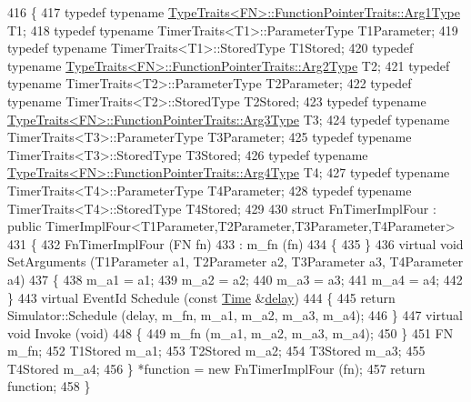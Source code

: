 \begin{DoxyCode}
416 \{
417   \textcolor{keyword}{typedef} \textcolor{keyword}{typename} \hyperlink{structTypeTraits}{TypeTraits<FN>::FunctionPointerTraits::Arg1Type}
       T1;
418   \textcolor{keyword}{typedef} \textcolor{keyword}{typename} TimerTraits<T1>::ParameterType T1Parameter;
419   \textcolor{keyword}{typedef} \textcolor{keyword}{typename} TimerTraits<T1>::StoredType T1Stored;
420   \textcolor{keyword}{typedef} \textcolor{keyword}{typename} \hyperlink{structTypeTraits}{TypeTraits<FN>::FunctionPointerTraits::Arg2Type}
       T2;
421   \textcolor{keyword}{typedef} \textcolor{keyword}{typename} TimerTraits<T2>::ParameterType T2Parameter;
422   \textcolor{keyword}{typedef} \textcolor{keyword}{typename} TimerTraits<T2>::StoredType T2Stored;
423   \textcolor{keyword}{typedef} \textcolor{keyword}{typename} \hyperlink{structTypeTraits}{TypeTraits<FN>::FunctionPointerTraits::Arg3Type}
       T3;
424   \textcolor{keyword}{typedef} \textcolor{keyword}{typename} TimerTraits<T3>::ParameterType T3Parameter;
425   \textcolor{keyword}{typedef} \textcolor{keyword}{typename} TimerTraits<T3>::StoredType T3Stored;
426   \textcolor{keyword}{typedef} \textcolor{keyword}{typename} \hyperlink{structTypeTraits}{TypeTraits<FN>::FunctionPointerTraits::Arg4Type}
       T4;
427   \textcolor{keyword}{typedef} \textcolor{keyword}{typename} TimerTraits<T4>::ParameterType T4Parameter;
428   \textcolor{keyword}{typedef} \textcolor{keyword}{typename} TimerTraits<T4>::StoredType T4Stored;
429 
430   \textcolor{keyword}{struct }FnTimerImplFour : \textcolor{keyword}{public} TimerImplFour<T1Parameter,T2Parameter,T3Parameter,T4Parameter>
431   \{
432     FnTimerImplFour (FN fn)
433       : m\_fn (fn)
434     \{
435     \}
436     \textcolor{keyword}{virtual} \textcolor{keywordtype}{void} SetArguments (T1Parameter a1, T2Parameter a2, T3Parameter a3, T4Parameter a4)
437     \{
438       m\_a1 = a1;
439       m\_a2 = a2;
440       m\_a3 = a3;
441       m\_a4 = a4;
442     \}
443     \textcolor{keyword}{virtual} EventId Schedule (\textcolor{keyword}{const} \hyperlink{namespacens3_1_1TracedValueCallback_a7ffd3e7c142ffe7c8a1d2db9b8de38ec}{Time} &\hyperlink{lte_2model_2fading-traces_2fading__trace__generator_8m_a7964e6aa8f61a9d28973c8267a606ad8}{delay})
444     \{
445       \textcolor{keywordflow}{return} Simulator::Schedule (delay, m\_fn, m\_a1, m\_a2, m\_a3, m\_a4);
446     \}
447     \textcolor{keyword}{virtual} \textcolor{keywordtype}{void} Invoke (\textcolor{keywordtype}{void})
448     \{
449       m\_fn (m\_a1, m\_a2, m\_a3, m\_a4);
450     \}
451     FN m\_fn;
452     T1Stored m\_a1;
453     T2Stored m\_a2;
454     T3Stored m\_a3;
455     T4Stored m\_a4;
456   \} *\textcolor{keyword}{function} = \textcolor{keyword}{new} FnTimerImplFour (fn);
457   \textcolor{keywordflow}{return} \textcolor{keyword}{function};
458 \}
\end{DoxyCode}


